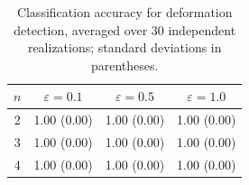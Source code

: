 \begin{table}[htbp]\centering
\caption{Classification accuracy for deformation detection, averaged over
30 independent realizations; standard deviations in parentheses.}
\label{tab:classification}
\begin{tabular}{cccc}\hline
\(n\) & \(\varepsilon = 0.1\) & \(\varepsilon = 0.5\) & \(\varepsilon = 1.0\) \\\hline
2 & 1.00 (0.00) & 1.00 (0.00) & 1.00 (0.00) \\
3 & 1.00 (0.00) & 1.00 (0.00) & 1.00 (0.00) \\
4 & 1.00 (0.00) & 1.00 (0.00) & 1.00 (0.00) \\
\hline\end{tabular}\end{table}